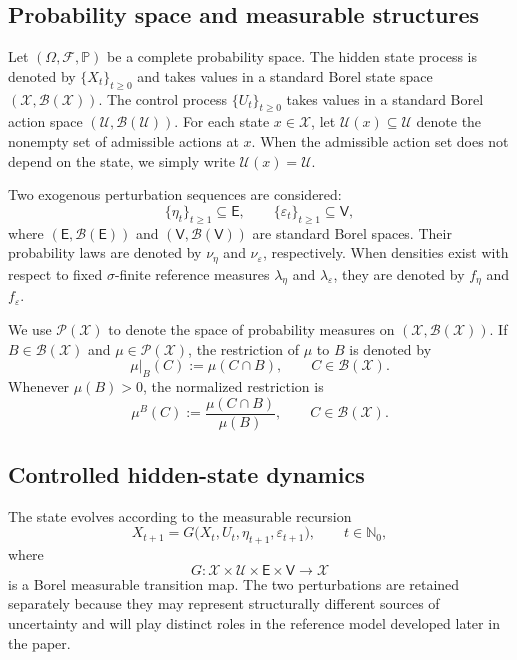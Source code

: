 \documentclass[10pt,twocolumn]{article}
\theoremstyle{remark}
\newcommand{\N}{\mathbb{N}}
\newcommand{\Pp}{\mathbb{P}}
\newcommand{\B}{\mathcal{B}}
\newcommand{\F}{\mathcal{F}}
\newcommand{\Pcal}{\mathcal{P}}
\newcommand{\Ucal}{\mathcal{U}}
\newcommand{\Xcal}{\mathcal{X}}
\begin{document}
\subsection{Probability space and measurable structures}
\label{subsec:probability-space}

Let $(\Omega,\F,\Pp)$ be a complete probability space. The hidden state process is denoted by $\{X_t\}_{t\geq 0}$ and takes values in a standard Borel state space $(\Xcal,\B(\Xcal))$. The control process $\{U_t\}_{t\geq 0}$ takes values in a standard Borel action space $(\Ucal,\B(\Ucal))$. For each state $x\in\Xcal$, let $\Ucal(x)\subseteq\Ucal$ denote the nonempty set of admissible actions at $x$. When the admissible action set does not depend on the state, we simply write $\Ucal(x)=\Ucal$.

Two exogenous perturbation sequences are considered:
\[
\{\eta_t\}_{t\geq 1}\subseteq\mathsf E,
\qquad
\{\varepsilon_t\}_{t\geq 1}\subseteq\mathsf V,
\]
where $(\mathsf E,\B(\mathsf E))$ and $(\mathsf V,\B(\mathsf V))$ are standard Borel spaces. Their probability laws are denoted by $\nu_\eta$ and $\nu_\varepsilon$, respectively. When densities exist with respect to fixed $\sigma$-finite reference measures $\lambda_\eta$ and $\lambda_\varepsilon$, they are denoted by $f_\eta$ and $f_\varepsilon$.

We use $\Pcal(\Xcal)$ to denote the space of probability measures on $(\Xcal,\B(\Xcal))$. If $B\in\B(\Xcal)$ and $\mu\in\Pcal(\Xcal)$, the restriction of $\mu$ to $B$ is denoted by
\[
\mu|_B(C):=\mu(C\cap B),
\qquad C\in\B(\Xcal).
\]
Whenever $\mu(B)>0$, the normalized restriction is
\[
\mu^B(C):=\frac{\mu(C\cap B)}{\mu(B)},
\qquad C\in\B(\Xcal).
\]

\subsection{Controlled hidden-state dynamics}
\label{subsec:controlled-dynamics}

The state evolves according to the measurable recursion
\begin{equation}
X_{t+1}=G\bigl(X_t,U_t,\eta_{t+1},\varepsilon_{t+1}\bigr),
\qquad t\in\N_0,
\label{eq:state-dynamics}
\end{equation}
where
\[
G:\Xcal\times\Ucal\times\mathsf E\times\mathsf V\longrightarrow\Xcal
\]
is a Borel measurable transition map. The two perturbations are retained separately because they may represent structurally different sources of uncertainty and will play distinct roles in the reference model developed later in the paper.
\end{document}
